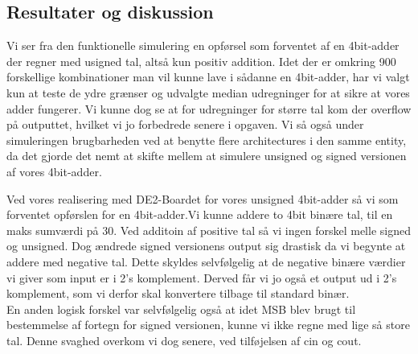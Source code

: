 \documentclass[../journal2.tex]{subfiles}
\begin{document}
\begin{table}[H]
    \centering
      \framebox{
        \rule{8pt}{0pt}
          
}
  \caption{Kode for 4bit-adder med unsigned og signed architecture, c\textunderscore in}	
  \label{src:Tab41}
\end{table}


\subsection{Resultater og diskussion}

Vi ser fra den funktionelle simulering en opførsel som forventet af en 4bit-adder der regner med usigned tal, altså kun positiv addition. Idet der er omkring 900 forskellige kombinationer man vil kunne lave i sådanne en 4bit-adder, har vi valgt kun at teste de ydre grænser og udvalgte median udregninger for at sikre at vores adder fungerer. Vi kunne dog se at for udregninger for større tal kom der overflow på outputtet, hvilket vi jo forbedrede senere i opgaven. Vi så også under simuleringen brugbarheden ved at benytte flere architectures i den samme entity, da det gjorde det nemt at skifte mellem at simulere unsigned og signed versionen af vores 4bit-adder.


Ved vores realisering med DE2-Boardet for vores unsigned 4bit-adder så vi som forventet opførslen for en 4bit-adder.Vi kunne addere to 4bit binære tal, til en maks sumværdi på 30. Ved additoin af positive tal så vi ingen forskel melle signed og unsigned. Dog ændrede signed versionens output sig drastisk da vi begynte at addere med negative tal. Dette skyldes selvfølgelig at de negative binære værdier vi giver som input er i 2's komplement. Derved får vi jo også et output ud i 2's komplement, som vi derfor skal konvertere tilbage til standard binær.\\
En anden logisk forskel var selvfølgelig også at idet MSB blev brugt til bestemmelse af fortegn for signed versionen, kunne vi ikke regne med lige så store tal. Denne svaghed overkom vi dog senere, ved tilføjelsen af c\textunderscore in og c\textunderscore out.

\end{document}
